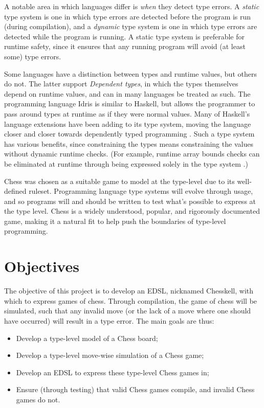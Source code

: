 \documentclass[12pt, a4paper, bibliography=totocnumbered]{scrreprt}
\begin{document}
A notable area in which languages differ is \emph{when} they detect type errors. A \emph{static} type system is one in which type errors are detected before the program is run (during compilation), and a \emph{dynamic} type system is one in which type errors are detected while the program is running. A static type system is preferable for runtime safety, since it ensures that any running program will avoid (at least some) type errors.

Some languages have a distinction between types and runtime values, but others do not. The latter support \emph{Dependent types}, in which the types themselves depend on runtime values, and can in many languages be treated as such. The programming language Idris is similar to Haskell, but allows the programmer to pass around types at runtime as if they were normal values. Many of Haskell's language extensions have been adding to its type system, moving the language closer and closer towards dependently typed programming \cite{singletons}. Such a type system has various benefits, since constraining the types means constraining the values without dynamic runtime checks. (For example, runtime array bounds checks can be eliminated at runtime through being expressed solely in the type system \cite{dependentarray}.)

Chess was chosen as a suitable game to model at the type-level due to its well-defined ruleset. Programming language type systems will evolve through usage, and so programs will and should be written to test what's possible to express at the type level. Chess is a widely understood, popular, and rigorously documented game, making it a natural fit to help push the boundaries of type-level programming.

\chapter{Objectives}

The objective of this project is to develop an EDSL, nicknamed Chesskell, with which to express games of chess. Through compilation, the game of chess will be simulated, such that any invalid move (or the lack of a move where one should have occurred) will result in a type error. The main goals are thus:

\begin{itemize}
    \item Develop a type-level model of a Chess board;
    \item Develop a type-level move-wise simulation of a Chess game;
    \item Develop an EDSL to express these type-level Chess games in;
    \item Ensure (through testing) that valid Chess games compile, and invalid Chess games do not.
\end{itemize}
\end{document}
